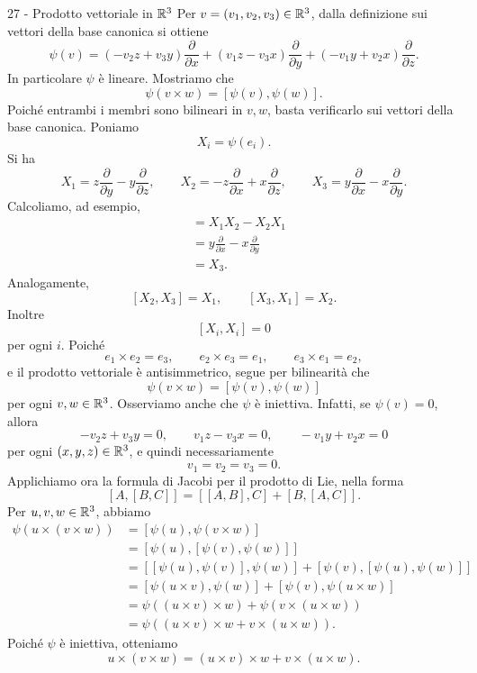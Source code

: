 \documentclass[a4paper]{article}
\begin{document}
\begin{snippetsolution}{27 - Prodotto vettoriale in \(\mathbb{R}^3\)}
    Per \(v=(v_1,v_2,v_3)\in\mathbb{R}^3\), dalla definizione sui vettori della base canonica si ottiene
    \[
        \psi(v)
        =
        (-v_2z+v_3y)\frac{\partial}{\partial x}
        +(v_1z-v_3x)\frac{\partial}{\partial y}
        +(-v_1y+v_2x)\frac{\partial}{\partial z}.
    \]
    In particolare \(\psi\) è lineare. Mostriamo che
    \[
        \psi(v\times w)=[\psi(v),\psi(w)].
    \]
    Poiché entrambi i membri sono bilineari in \(v,w\), basta verificarlo sui vettori della base canonica. Poniamo
    \[
        X_i=\psi(e_i).
    \]
    Si ha
    \[
        X_1=z\frac{\partial}{\partial y}-y\frac{\partial}{\partial z},
        \qquad
        X_2=-z\frac{\partial}{\partial x}+x\frac{\partial}{\partial z},
        \qquad
        X_3=y\frac{\partial}{\partial x}-x\frac{\partial}{\partial y}.
    \]
    Calcoliamo, ad esempio,
    \begin{align*}
        [X_1,X_2]
        &=
        X_1X_2-X_2X_1\\
        &=
        y\frac{\partial}{\partial x}-x\frac{\partial}{\partial y}\\
        &=
        X_3.
    \end{align*}
    Analogamente,
    \[
        [X_2,X_3]=X_1,
        \qquad
        [X_3,X_1]=X_2.
    \]
    Inoltre
    \[
        [X_i,X_i]=0
    \]
    per ogni \(i\). Poiché
    \[
        e_1\times e_2=e_3,
        \qquad
        e_2\times e_3=e_1,
        \qquad
        e_3\times e_1=e_2,
    \]
    e il prodotto vettoriale è antisimmetrico, segue per bilinearità che
    \[
        \psi(v\times w)=[\psi(v),\psi(w)]
    \]
    per ogni \(v,w\in\mathbb{R}^3\).
    Osserviamo anche che \(\psi\) è iniettiva. Infatti, se \(\psi(v)=0\), allora
    \[
        -v_2z+v_3y=0,
        \qquad
        v_1z-v_3x=0,
        \qquad
        -v_1y+v_2x=0
    \]
    per ogni \((x,y,z)\in\mathbb{R}^3\), e quindi necessariamente
    \[
        v_1=v_2=v_3=0.
    \]
    Applichiamo ora la formula di Jacobi per il prodotto di Lie, nella forma
    \[
        [A,[B,C]]
        =
        [[A,B],C]+[B,[A,C]].
    \]
    Per \(u,v,w\in\mathbb{R}^3\), abbiamo
    \begin{align*}
        \psi(u\times(v\times w))
        &=
        [\psi(u),\psi(v\times w)]\\
        &=
        [\psi(u),[\psi(v),\psi(w)]]\\
        &=
        [[\psi(u),\psi(v)],\psi(w)]
        +
        [\psi(v),[\psi(u),\psi(w)]]\\
        &=
        [\psi(u\times v),\psi(w)]
        +
        [\psi(v),\psi(u\times w)]\\
        &=
        \psi((u\times v)\times w)
        +
        \psi(v\times(u\times w))\\
        &=
        \psi((u\times v)\times w+v\times(u\times w)).
    \end{align*}
    Poiché \(\psi\) è iniettiva, otteniamo
    \[
        u\times(v\times w)
        =
        (u\times v)\times w+v\times(u\times w).
    \]
\end{snippetsolution}
\end{document}
